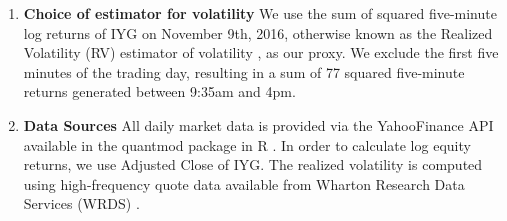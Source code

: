 \documentclass{uiucthesis2021}
\theoremstyle{definition}
\begin{document}
\begin{enumerate}
    \item \textbf{Choice of estimator for volatility} We use the sum of squared five-minute log returns of IYG on November 9th, 2016, otherwise known as the Realized Volatility (RV) estimator of volatility \parencite[][]{andersen2008realized}, as our proxy.  We exclude the first five minutes of the trading day, resulting in a sum of 77 squared five-minute returns generated between 9:35am and 4pm.
    \item \textbf{Data Sources} All daily market data is provided via the YahooFinance API available in the quantmod package in R \parencite[][]{ryan2015package}.  In order to calculate log equity returns, we use Adjusted Close of IYG.  The realized volatility is computed using high-frequency quote data available from Wharton Research Data Services (WRDS) \parencite[][]{wachowicz2020wharton}.
\end{enumerate} 
\end{document}
